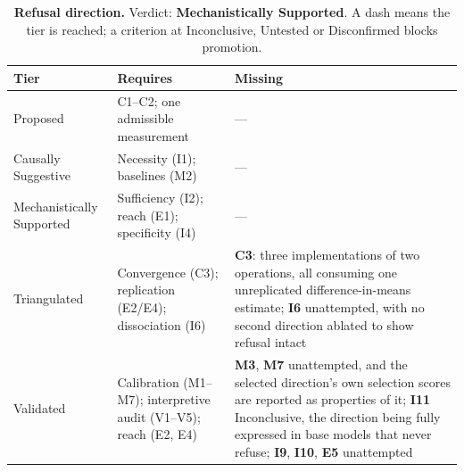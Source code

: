 \begin{table}[H]
\centering
\footnotesize
\caption{\textbf{Refusal direction.} Verdict: \textbf{Mechanistically Supported}. A dash means the tier is reached; a criterion at
Inconclusive, Untested or Disconfirmed blocks promotion.}
\label{tab:refusal-verdict}
\renewcommand{\arraystretch}{1.18}
\begin{tabular}{@{}l>{\raggedright\arraybackslash}p{3.6cm}>{\raggedright\arraybackslash}p{4.4cm}@{}}
\toprule
\textbf{Tier} & \textbf{Requires} & \textbf{Missing} \\
\midrule
Proposed & C1--C2; one admissible measurement & --- \\
\addlinespace[2pt]
Causally Suggestive & Necessity (I1); baselines (M2) & --- \\
\addlinespace[2pt]
Mechanistically Supported & Sufficiency (I2); reach (E1); specificity (I4) & --- \\
\addlinespace[2pt]
Triangulated & Convergence (C3); replication (E2/E4); dissociation (I6) & \textbf{C3}: three implementations of two operations, all consuming one unreplicated difference-in-means estimate; \textbf{I6} unattempted, with no second direction ablated to show refusal intact \\
\addlinespace[2pt]
Validated & Calibration (M1--M7); interpretive audit (V1--V5); reach (E2, E4) & \textbf{M3}, \textbf{M7} unattempted, and the selected direction's own selection scores are reported as properties of it; \textbf{I11} Inconclusive, the direction being fully expressed in base models that never refuse; \textbf{I9}, \textbf{I10}, \textbf{E5} unattempted \\
\bottomrule
\end{tabular}
\end{table}
